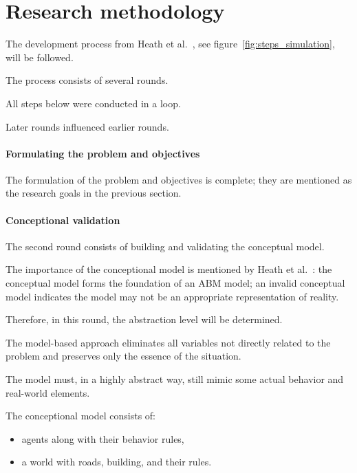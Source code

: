 \section{Research methodology}

The development process from Heath et al.~\cite{heath2009survey}, see figure~\ref{fig:steps_simulation},  will be followed.


The process consists of several rounds.

All steps below were conducted in a loop.

Later rounds influenced earlier rounds.

\paragraph{Formulating the problem and objectives}

The formulation of the problem and objectives is complete; they are mentioned as the research goals in the previous section.

\paragraph{Conceptional validation}

The second round consists of building and validating the conceptual model.




The importance of the conceptional model is mentioned by Heath et al.~\cite{heath2009survey}: the conceptual model forms the foundation of an ABM model; an invalid conceptual model indicates the model may not be an appropriate representation of reality.


Therefore, in this round, the abstraction level will be determined.

The model-based approach eliminates all variables not directly related to the problem and preserves only the essence of the situation.

The model must, in a highly abstract way, still mimic some actual behavior and real-world elements.


The conceptional model consists of:\\

\begin{itemize}
    \item agents along with their behavior rules,\\
    \item a world with roads, building, and their rules.\\
\end{itemize}


